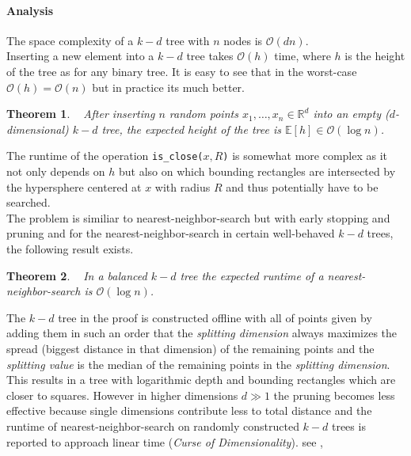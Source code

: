\documentclass[a4paper,12pt,headsepline]{scrartcl}
\newtheorem{theorem}{Theorem}
\begin{document}
\paragraph{Analysis}
The space complexity of a $k-d$ tree with $n$ nodes is $\mathcal O(dn)$.\\
Inserting a new element into a $k-d$ tree takes $\mathcal O(h)$ time, where 
$h$ is the height of the tree as for any binary tree. It is easy to see
that in the worst-case $\mathcal O(h) = \mathcal O(n)$ but in practice its much better.\\
\begin{theorem}~\citep{Bentley75}
After inserting $n$ random points $x_1, \dots, x_n \in \mathbb R^d$
into an empty ($d$-dimensional) $k-d$ tree, the expected height
of the tree is $\mathbb E[h] \in \mathcal O(\log n)$. 
\end{theorem}
\noindent The runtime of the operation \texttt{is\_close($x, R$)} is somewhat more complex as 
it not only depends on $h$ but also on which bounding rectangles 
are intersected by the hypersphere centered at $x$ with radius $R$
and thus potentially have to be searched.\\
The problem is similiar to nearest-neighbor-search but with early
stopping and pruning and for the nearest-neighbor-search in certain
well-behaved $k-d$ trees, the following result exists.
\begin{theorem}~\citep{skrodzki2019}
    In a balanced $k-d$ tree the expected runtime of a nearest-neighbor-search
    is $\mathcal O(\log n)$.
\end{theorem}
The $k-d$ tree in the proof is constructed offline with all of points given 
by adding them in such an order that the \textit{splitting dimension} always maximizes 
the spread (biggest distance in that dimension) of the remaining points
and the \textit{splitting value} is the median of the remaining points in the
\textit{splitting dimension}. This results in a tree with logarithmic depth and
bounding rectangles which are closer to squares.
\noindent However in higher dimensions $d \gg 1$ the pruning 
becomes less effective because single dimensions contribute less to 
total distance and the runtime of nearest-neighbor-search
on randomly constructed $k-d$ trees is reported to approach linear time 
(\textit{Curse of Dimensionality}). see \cite{nn_dimcurse1}, \cite{nn_dimcurse2}\\
\end{document}

